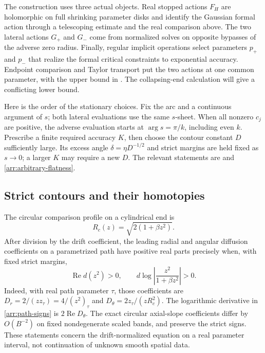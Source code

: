 The construction uses three actual objects.  Real stopped actions
$F_H$ are holomorphic on full shrinking parameter disks and identify
the Gaussian formal action through a telescoping estimate and the real
comparison above.  The two lateral actions $G_+$ and $G_-$ come from
normalized solves on opposite bypasses of the adverse zero radius.
Finally, regular implicit operations select parameters $p_+$ and $p_-$
that realize the formal critical constraints to exponential accuracy.
Endpoint comparison and Taylor transport put the two actions at one
common parameter, with the upper bound in .
The collapsing-end calculation will give a conflicting lower bound.

Here is the order of the stationary choices.  Fix the arc and a
continuous argument of $s$; both lateral evaluations use the same
$s$-sheet.  When all nonzero $c_j$ are positive, the adverse evaluation
starts at $\arg s=\pi/k$, including even $k$.  Prescribe a finite
required accuracy $K$, then choose the contour constant $D$ sufficiently
large.  Its excess angle $\delta=\eta D^{-1/2}$ and strict margins are
held fixed as $s\to0$; a larger $K$ may require a new $D$.
The relevant statements are 
and \eqref{arr:arbitrary-flatness}.

\subsection{Strict contours and their homotopies}\label{sec:contours}

The circular comparison profile on a cylindrical end is
\[
 R_c(z)=\sqrt{2(1+\beta z^2)}.
\]
After division by the drift coefficient, the leading radial and
angular diffusion coefficients on a parametrized path have positive
real parts precisely when, with fixed strict margins,
\begin{equation}\label{arr:path-signs}
 \operatorname{Re}d(z^2)>0,\qquad
 d\log\left|\frac{z^2}{1+\beta z^2}\right|>0.
\end{equation}
Indeed, with real path parameter \(\tau\), those coefficients are
\(D_r=2/(zz_\tau)=4/(z^2)_\tau\) and
\(D_\theta=2z_\tau/(zR_c^2)\).  The logarithmic derivative in
\eqref{arr:path-signs} is \(2\operatorname{Re}D_\theta\).
The exact circular axial-slope coefficients differ by \(O(B^{-2})\)
on fixed nondegenerate scaled bands, and preserve the strict signs.
These statements
concern the drift-normalized equation on a real parameter interval,
not continuation of unknown smooth spatial data.

